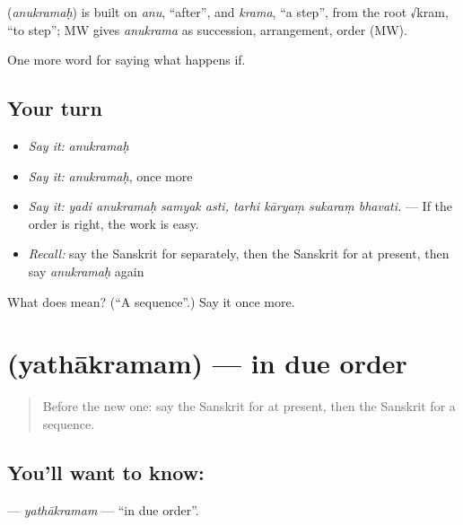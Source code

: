 \begin{cousinweb}
\textbf{} (\emph{anukramaḥ}) is built on \emph{anu}, \textquotedblleft{}after\textquotedblright{}, and \emph{krama}, \textquotedblleft{}a step\textquotedblright{}, from the root √kram, \textquotedblleft{}to step\textquotedblright{}; MW gives \emph{anukrama} as succession, arrangement, order (MW).
\end{cousinweb}

\begin{grammarlens}[title={What you've built}]
One more word for saying what happens if.
\end{grammarlens}

\subsection*{Your turn}
\begin{itemize}
\raggedright
  \item \emph{Say it:} \emph{anukramaḥ}
  \item \emph{Say it:} \emph{anukramaḥ}, once more
  \item \emph{Say it:} \emph{yadi anukramaḥ samyak asti, tarhi kāryaṃ sukaraṃ bhavati.} — If the order is right, the work is easy.
  \item \emph{Recall:} say the Sanskrit for separately, then the Sanskrit for at present, then say \emph{anukramaḥ} again
\end{itemize}

\begin{tcolorbox}[breakable,colback=teal!4,colframe=teal!35!black,title={Before you move on}]
What does  mean? (\textquotedblleft{}A sequence\textquotedblright{}.) Say it once more.
\end{tcolorbox}
\section[\texorpdfstring{\sk{यथाक्रमम्} (yathākramam)}{यथाक्रमम् (yathākramam)}]{ (yathākramam) — in due order}

\label{lesson:SA-C545-yathakramam}



\begin{quote}
Before the new one: say the Sanskrit for at present, then the Sanskrit for a sequence.
\end{quote}

\subsection*{You'll want to know: }
\textbf{} — \emph{yathākramam} — \textquotedblleft{}in due order\textquotedblright{}.

